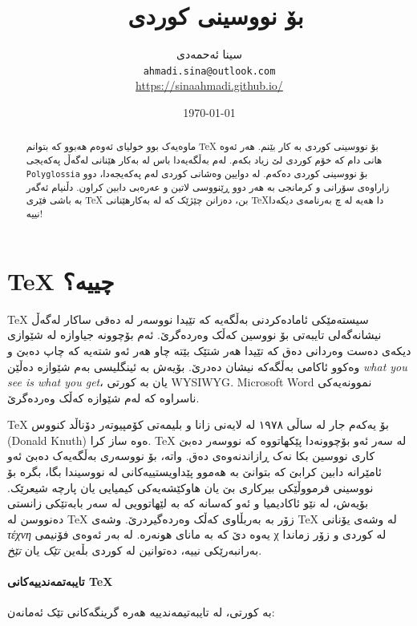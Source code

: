 \documentclass[14pt]{article}
\title{ \XeLaTeX~بۆ نووسینی کوردی}
\author{سینا ئەحمەدی \\ {\small \texttt{ahmadi.sina@outlook.com} } \\ {\small \url{https://sinaahmadi.github.io/}}}
\date{\today}
\begin{document}
\maketitle
\tableofcontents

\begin{abstract}

ماوەیەک بوو خولیای ئەوەم هەبوو کە بتوانم 
\textenglish{\TeX} بۆ نووسینی کوردی بە کار بێنم. هەر ئەوە هانی دام کە خۆم کوردی لێ زیاد بکەم.
لەم بەڵگەیەدا باس لە بەکار هێنانی \textenglish{\XeLaTeX} لەگەڵ پەکەیجی 
\texttt{\textenglish{Polyglossia}}
 بۆ نووسینی کوردی دەکەم.
 لە دوایین وەشانی کوردی لەم پەکەیجەدا، دوو زاراوەی سۆرانی و کرمانجی بە هەر دوو ڕێنووسی لاتین و عەرەبی دابین کراون.
دڵنیام ئەگەر بە باشی فێری \textenglish{\TeX} بن، دەزانن چێژێک کە لە بەکارهێنانی \textenglish{\TeX}دا هەیە لە چ بەرنامەی دیکەدا نییە!
\end{abstract}

\section{\textenglish{\TeX} چییە؟}

\textenglish{\TeX} سیستەمێکی ئامادەکردنی بەڵگەیە کە تێیدا نووسەر لە دەقی ساکار لەگەڵ نیشانەگەلی تایبەتی بۆ نووسین کەڵک وەردەگرێ. ئەم بۆچوونە جیاوازە لە شێوازی دیکەی دەست وەردانی دەق کە تێیدا هەر شتێک بێتە چاو هەر ئەو شتەیە کە چاپ دەبێ و وەکوو ئاکامی بەڵگەکە نیشان دەدرێ. بۆیەش بە ئینگلیسی بەم شێوازە دەڵێن \textenglish{\textit{what you see is what you get}}، یان بە کورتی \textenglish{WYSIWYG}. \textenglish{Microsoft Word} نموونەیەکی ناسراوە کە لەم شێوازە کەڵک وەردەگرێ.

\textenglish{\TeX}
بۆ یەکەم جار لە ساڵی ١٩٧٨ لە لایەنی زانا و بلیمەتی کۆمپیوتەر دۆناڵد کنووس
(\textenglish{Donald Knuth})
ەوە ساز کرا.
\textenglish{\TeX} لە سەر ئەو بۆچوونەدا پێکهاتووە کە نووسەر دەبێ کاری نووسین بکا نەک ڕازاندنەوەی دەق. واتە، بۆ نووسەری بەڵگەیەک دەبێ ئەو ئامێرانە دابین کرابێ کە بتوانێ بە هەموو پێداویستییەکانی لە نووسیندا بگا، بگرە بۆ نووسینی فرمووڵێکی بیرکاری بێ یان هاوکێشەیەکی کیمیایی یان پارچە شیعرێک. بۆیەش، لە نێو ئاکادیمیا و ئەو کەسانه کە بە لێهاتوویی لە سەر بابەتێکی زانستی دەنووسن لە \textenglish{\TeX} زۆر بە بەربڵاوی کەڵک وەردەگیردرێ. 
وشەی 
\textenglish{\TeX}
 لە وشەی یۆنانی
\textgreek{\textit{τέχνη}}
یەوە
 دێ کە بە مانای هونەرە. لە بەر ئەوەی فۆنیمی 
\textgreek{χ} 
 لە کوردی و زۆر زماندا بەرانبەرێکی نییە، دەتوانین لە کوردی بڵەین
\textit{تێک} یان \textit{تێخ}.

\paragraph{تایبەتمەندییەکانی \TeX}
 بە کورتی، لە تایبەتیمەندییە هەرە گرینگەکانی تێک ئەمانەن:
 
\end{document}
